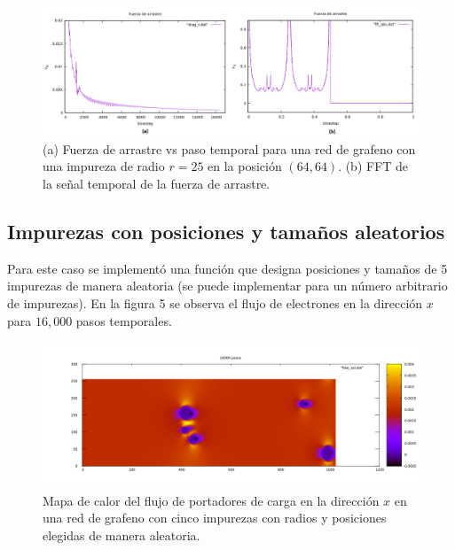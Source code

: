 \documentclass{article}
\begin{document}
\begin{figure}[th!]
   \includegraphics[width=1.1\columnwidth]{F_D_1obj.png}   \caption{(a) Fuerza de arrastre vs paso temporal para una red de grafeno con una impureza de radio $r=25$ en la posición $(64, 64)$. (b) FFT de la señal temporal de la fuerza de arrastre.}
\end{figure}
 
 \subsection{Impurezas con posiciones y tamaños aleatorios}
 Para este caso se implementó una función que designa posiciones y tamaños de 5 impurezas de manera aleatoria (se puede implementar para un número arbitrario de impurezas). En la figura 5 se observa el flujo de electrones en la dirección $x$ para $16,000$ pasos temporales. 
\begin{figure}[th!]
   \includegraphics[width=1.0\columnwidth]{aleat.png}   \caption{Mapa de calor del flujo de portadores de carga en la dirección $x$ en una red de grafeno con cinco impurezas con radios y posiciones elegidas de manera aleatoria.}
\end{figure}
 
\end{document}
